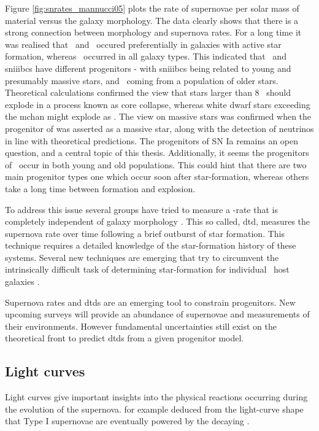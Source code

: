 Figure \ref{fig:snrates_mannucci05} plots the rate of supernovae per solar mass of material versus the galaxy morphology. The data clearly shows that there is a strong connection between morphology and supernova rates. For a long time it was realised that \sneii\ and \sneibc\ occured preferentially in galaxies with active star formation, whereas \sneia\ occurred in all galaxy types. This indicated that \sneia\ and \glspl{sniiibc} have different progenitors - with \glspl{sniiibc} being related to young and presumably massive stars, and \sneia\ coming from a population of older stars. Theoretical calculations confirmed the view that stars larger than 8 \msun\ should explode in a process known as core collapse, whereas white dwarf stars exceeding the \gls{mchan} might explode as \snia. 
 The view on massive stars was confirmed when the progenitor of  was asserted as a massive star, along with the detection of neutrinos in line with theoretical predictions. The progenitors of SN Ia remains an open question, and a central topic of this thesis. Additionally, it seems the progenitors of \sneia\ occur in both young and old populations. This could hint that there are two main progenitor types one which occur soon after star-formation, whereas others take a long time between formation and explosion. 

To address this issue several groups have tried to measure a \sneia-rate that is completely independent of galaxy morphology \citep[e.g.][]{2006MNRAS.370..773M, 2010ApJ...722.1879M}. This so called, \gls{dtd}, measures the supernova rate over time following a brief outburst of star formation.
This technique requires a detailed knowledge of the star-formation history of these systems. Several new techniques are emerging that try to circumvent the intrinsically difficult task of determining star-formation for individual \sneia\ host galaxies \citep{2010MNRAS.407.1314M, 2010arXiv1010.5786B, 2008PASJ...60.1327T, 2010ApJ...722.1879M}.

Supernova rates and \glspl{dtd} are an emerging tool to constrain progenitors. New upcoming surveys will provide an abundance of supernovae and measurements of their environments.  However fundamental uncertainties still exist on the theoretical front to predict \glspl{dtd} from a given progenitor model.

\subsection{Light curves} 
\label{sec:intro_lc}
Light curves give important insights into the physical reactions occurring during the evolution of the supernova. \cite{1982ApJ...253..785A} for example deduced from the light-curve shape that Type I supernovae are eventually powered by the decaying \Co. 


